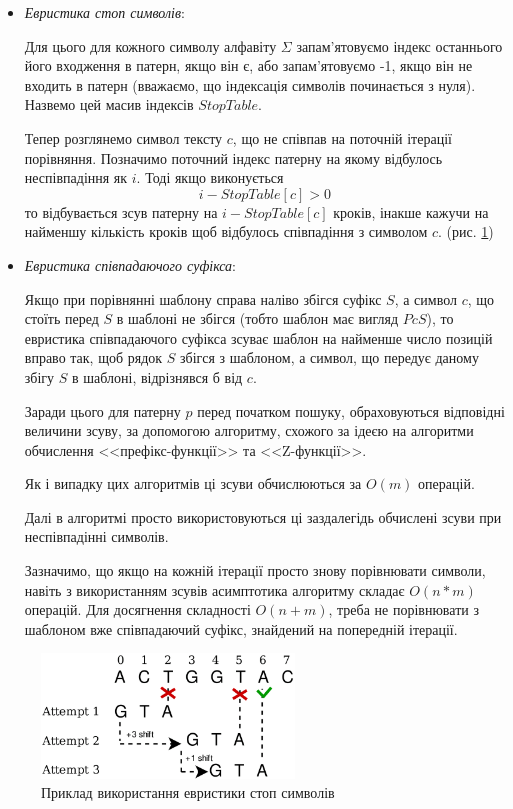 \documentclass[a4paper,14pt]{extarticle} %
\begin{document}
\begin{itemize}
	\item \textit{Евристика стоп символів}:
	
	Для цього для кожного символу алфавіту $\Sigma$ запам'ятовуємо індекс останнього його входження в патерн, якщо він є, або запам'ятовуємо -1, якщо він не входить в патерн (вважаємо, що індексація символів починається з нуля). 
	Назвемо цей масив індексів $StopTable$.
	
	Тепер розглянемо символ тексту $c$, що не співпав на поточній ітерації порівняння. Позначимо поточний індекс патерну на якому відбулось неспівпадіння як $i$.
	Тоді якщо виконується \[i-StopTable[c] > 0\] то відбувається зсув патерну на $i-StopTable[c]$ кроків, інакше кажучи на найменшу кількість кроків щоб відбулось співпадіння з символом $c$. (рис. \ref{fig:boyer_moore})
	\item \textit{Евристика співпадаючого суфікса}:
	
	Якщо при порівнянні шаблону справа наліво збігся суфікс \( S \), а символ \( c \), що стоїть перед \( S \) в шаблоні не збігся (тобто шаблон має вигляд \( PcS \)),
 	то евристика співпадаючого суфікса зсуває шаблон на найменше число позицій вправо так, щоб рядок \( S \) збігся з шаблоном, а символ, що передує даному збігу \( S \) в шаблоні, відрізнявся б від \( c \).
	
	Заради цього для патерну $p$ перед початком пошуку, обраховуються відповідні величини зсуву, за допомогою алгоритму,
	схожого за ідеєю на алгоритми обчислення <<префікс-функції>> та <<Z-функції>>.

	Як і випадку цих алгоритмів ці зсуви обчислюються за $O(m)$ операцій.
	
	Далі в алгоритмі просто використовуються ці заздалегідь обчислені зсуви при неспівпадінні символів.

	Зазначимо, що якщо на кожній ітерації просто знову порівнювати символи, навіть з використанням зсувів асимптотика алгоритму
	складає $O(n*m)$ операцій. Для досягнення складності $O(n+m)$, треба не порівнювати з шаблоном вже співпадаючий суфікс, знайдений на попередній ітерації.

\end{itemize}
	\begin{figure}[h] %
		\centering %
		\includegraphics[width=0.6\textwidth]{images/boyer_moore.png} %
		\caption{Приклад використання евристики стоп символів} %
		\label{fig:boyer_moore} %
	\end{figure}
\end{document}
